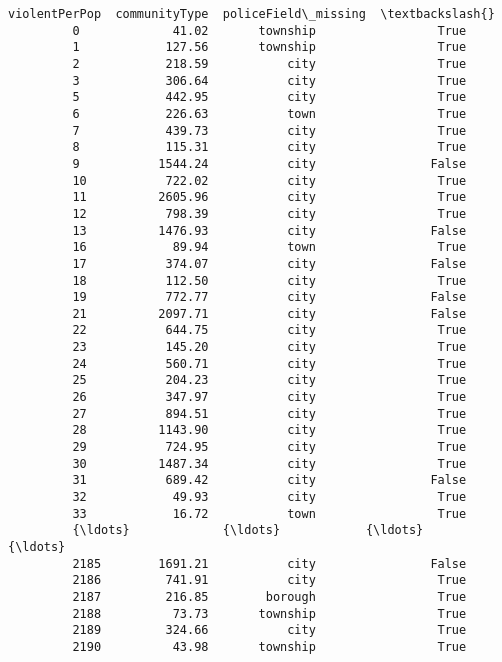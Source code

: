 \documentclass[11pt]{llncs}
\begin{document}
\begin{Verbatim}[commandchars=\\\{\}]
               violentPerPop  communityType  policeField\_missing  \textbackslash{}
         0             41.02       township                 True   
         1            127.56       township                 True   
         2            218.59           city                 True   
         3            306.64           city                 True   
         5            442.95           city                 True   
         6            226.63           town                 True   
         7            439.73           city                 True   
         8            115.31           city                 True   
         9           1544.24           city                False   
         10           722.02           city                 True   
         11          2605.96           city                 True   
         12           798.39           city                 True   
         13          1476.93           city                False   
         16            89.94           town                 True   
         17           374.07           city                False   
         18           112.50           city                 True   
         19           772.77           city                False   
         21          2097.71           city                False   
         22           644.75           city                 True   
         23           145.20           city                 True   
         24           560.71           city                 True   
         25           204.23           city                 True   
         26           347.97           city                 True   
         27           894.51           city                 True   
         28          1143.90           city                 True   
         29           724.95           city                 True   
         30          1487.34           city                 True   
         31           689.42           city                False   
         32            49.93           city                 True   
         33            16.72           town                 True   
         {\ldots}             {\ldots}            {\ldots}                  {\ldots}   
         2185        1691.21           city                False   
         2186         741.91           city                 True   
         2187         216.85        borough                 True   
         2188          73.73       township                 True   
         2189         324.66           city                 True   
         2190          43.98       township                 True   

\end{Verbatim}
\end{document}
